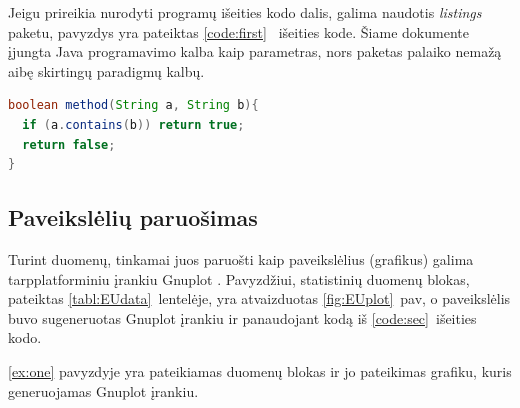 \documentclass[a4paper,12pt]{article}
\begin{document}
Jeigu prireikia nurodyti programų išeities kodo dalis, galima naudotis
\emph{listings} paketu, pavyzdys yra pateiktas \ref{code:first}~
išeities kode. Šiame dokumente įjungta Java programavimo kalba kaip
parametras, nors paketas palaiko nemažą aibę skirtingų paradigmų
kalbų.


\begin{lstlisting}[language=Java,caption={Java metodo pateikimo pavyzdys},label={code:first},emph={0},emphstyle=\color{red}]
boolean method(String a, String b){
  if (a.contains(b)) return true;
  return false;
}
\end{lstlisting}

\subsection{Paveikslėlių paruošimas}
Turint duomenų, tinkamai juos paruošti kaip paveikslėlius (grafikus)
galima tarpplatforminiu įrankiu Gnuplot \cite{GnuPlot}. Pavyzdžiui,
statistinių duomenų blokas, pateiktas \ref{tabl:EUdata}~lentelėje, yra
atvaizduotas \ref{fig:EUplot}~pav, o paveikslėlis buvo sugeneruotas
Gnuplot įrankiu ir panaudojant kodą iš \ref{code:sec}~išeities kodo.



\ref{ex:one} pavyzdyje yra pateikiamas duomenų blokas ir jo pateikimas grafiku, kuris generuojamas Gnuplot įrankiu.
\end{document}
